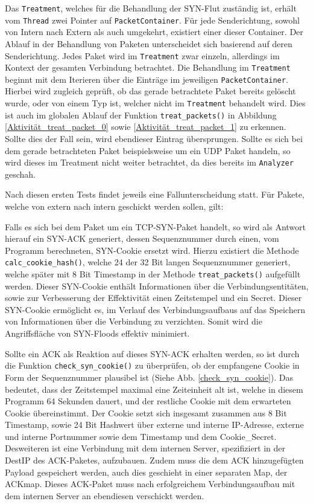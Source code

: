 \documentclass[../review_2.tex]{subfiles}
\begin{document}
Das \texttt{Treatment}, welches für die Behandlung der SYN-Flut zuständig ist, erhält vom \texttt{Thread} zwei Pointer auf \texttt{PacketContainer}. Für jede Senderichtung, sowohl von Intern nach Extern als auch umgekehrt, existiert einer dieser Container. Der Ablauf in der Behandlung von Paketen unterscheidet sich basierend auf deren Senderichtung. Jedes Paket wird im \texttt{Treatment} zwar einzeln, allerdings im Kontext der gesamten Verbindung betrachtet. Die Behandlung im \texttt{Treatment} beginnt mit dem Iterieren über die Einträge im jeweiligen \texttt{PacketContainer}. Hierbei wird zugleich geprüft, ob das gerade betrachtete Paket bereits gelöscht wurde, oder von einem Typ ist, welcher nicht im \texttt{Treatment} behandelt wird. Dies ist auch im globalen Ablauf der Funktion \texttt{treat\_packets()} in Abbildung \ref{Aktivität_treat_packet_0} sowie \ref{Aktivität_treat_packet_1} zu erkennen. Sollte dies der Fall sein, wird ebendieser Eintrag übersprungen. Sollte es sich bei dem gerade betrachteten Paket beispielsweise um ein UDP Paket handeln, so wird dieses im Treatment nicht weiter betrachtet, da dies bereits im \texttt{Analyzer} geschah. 

Nach diesen ersten Tests findet jeweils eine Fallunterscheidung statt. Für Pakete, welche von extern nach intern geschickt werden sollen, gilt: 

Falls es sich bei dem Paket um ein TCP-SYN-Paket handelt, so wird als Antwort hierauf ein SYN-ACK generiert, dessen Sequenznummer durch einen, vom Programm berechneten, SYN-Cookie ersetzt wird. Hierzu existiert die Methode \texttt{calc\_cookie\_hash()}, welche 24 der 32 Bit langen Sequenznummer generiert, welche später mit 8 Bit Timestamp in der Methode \texttt{treat\_packets()} aufgefüllt werden. Dieser SYN-Cookie enthält Informationen über die Verbindungsentitäten, sowie zur Verbesserung der Effektivität einen Zeitstempel und ein Secret. Dieser SYN-Cookie ermöglicht es, im Verlauf des Verbindungsaufbaus auf das Speichern von Informationen über die Verbindung zu verzichten. Somit wird die Angriffsfläche von SYN-Floods effektiv minimiert. 

Sollte ein ACK als Reaktion auf dieses SYN-ACK erhalten werden, so ist durch die Funktion \texttt{check\_syn\_cookie()} zu überprüfen, ob der empfangene Cookie in Form der Sequenznummer plausibel ist (Siehe Abb. \ref{check_syn_cookie}). Das bedeutet, dass der Zeitstempel maximal eine Zeiteinheit alt ist, welche in diesem Programm 64 Sekunden dauert, und der restliche Cookie mit dem erwarteten Cookie übereinstimmt. Der Cookie setzt sich insgesamt zusammen aus 8 Bit Timestamp, sowie 24 Bit Hashwert über externe und interne IP-Adresse, externe und interne Portnummer sowie dem Timestamp und dem Cookie\_Secret. 
Desweiteren ist eine Verbindung mit dem internen Server, spezifiziert in der DestIP des ACK-Paketes, aufzubauen. Zudem muss die dem ACK hinzugefügten Payload gespeichert werden, auch dies geschieht in einer separaten Map, der ACKmap. Dieses ACK-Paket muss nach erfolgreichem Verbindungsaufbau mit dem internen Server an ebendiesen verschickt werden. 
\end{document}
